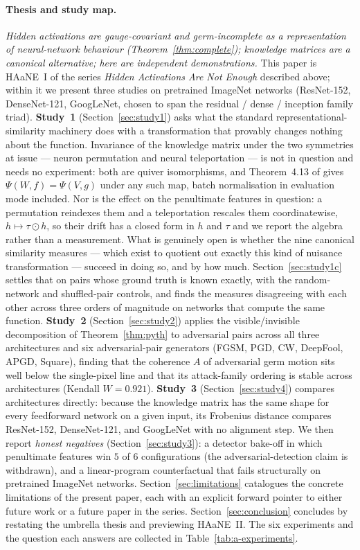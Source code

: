 \paragraph{Thesis and study map.}
\emph{Hidden activations are gauge-covariant and germ-incomplete
as a representation of neural-network behaviour
(Theorem~\ref{thm:complete}); knowledge matrices are a
canonical alternative; here are independent demonstrations.} This
paper is HAaNE~I of the series \emph{Hidden Activations Are Not
Enough} described above; within it we present three studies on
pretrained ImageNet networks (ResNet-152, DenseNet-121, GoogLeNet,
chosen to span the residual / dense / inception family triad). \textbf{Study~1} (Section~\ref{sec:study1}) asks what the standard
representational-similarity machinery does with a transformation that provably
changes nothing about the function. Invariance of the knowledge matrix under the
two symmetries at issue --- neuron permutation and neural teleportation --- is not
in question and needs no experiment: both are quiver isomorphisms, and
Theorem~4.13 of \citet{armenta2021representation} gives
$\Psi(W,f)=\Psi(V,g)$ under any such map, batch normalisation in evaluation mode
included. Nor is the effect on the penultimate features in question: a
permutation reindexes them and a teleportation rescales them coordinatewise,
$h\mapsto\tau\odot h$, so their drift has a closed form in $h$ and $\tau$ and we
report the algebra rather than a measurement. What is genuinely open is whether
the nine canonical similarity measures --- which exist to quotient out exactly
this kind of nuisance transformation --- succeed in doing so, and by how much.
Section~\ref{sec:study1c} settles that on pairs whose ground truth is known
exactly, with the random-network and shuffled-pair controls, and finds the
measures disagreeing with each other across three orders of magnitude on
networks that compute the same function. \textbf{Study~2} (Section~\ref{sec:study2}) applies the
visible/invisible decomposition of Theorem~\ref{thm:pyth} to
adversarial pairs across all three architectures and six adversarial-pair
generators (FGSM, PGD, CW, DeepFool, APGD, Square), finding that the
coherence $A$ of adversarial germ motion sits well below the single-pixel
line and that its attack-family ordering is stable across architectures
(Kendall $W=0.921$). \textbf{Study~3} (Section~\ref{sec:study4})
compares architectures directly: because the knowledge matrix has the
same shape for every feedforward network on a given input, its
Frobenius distance compares ResNet-152, DenseNet-121, and GoogLeNet
with no alignment step. We then report \emph{honest negatives}
(Section~\ref{sec:study3}): a detector bake-off in which penultimate
features win $5$ of $6$ configurations (the adversarial-detection claim
is withdrawn), and a linear-program counterfactual that fails structurally
on pretrained ImageNet networks. Section~\ref{sec:limitations} catalogues the
concrete limitations of the present paper, each with an
explicit forward pointer to either future work or a future paper in
the series. Section~\ref{sec:conclusion} concludes by restating the
umbrella thesis and previewing HAaNE~II. The six experiments and the
question each answers are collected in Table~\ref{tab:a-experiments}.

